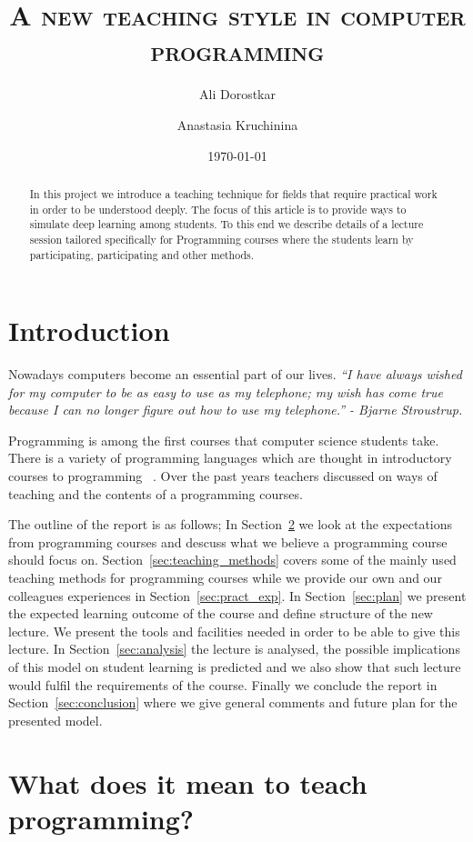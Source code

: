 \documentclass{article}
\author{Ali Dorostkar \and Anastasia Kruchinina}
\title{\textsc{A new teaching style in computer programming}}
\date{\today}
\begin{document}
\maketitle \begin{abstract}
In this project we introduce a teaching technique for fields that require
practical work in order to be understood deeply. The focus of this article is
to provide ways to simulate deep learning among students. To this end we describe
details of a lecture session tailored specifically for Programming courses
where the students learn by participating, participating and other methods.
\end{abstract}

\section{Introduction} %
\label{sec:introduction}

Nowadays computers become an essential part of our lives.  \emph{``I have always wished
for my computer to be as easy to use as my telephone; my wish has come true
because I can no longer figure out how to use my telephone.'' - Bjarne
Stroustrup.}

Programming is among the first courses that computer science students take.
There is a variety of programming languages which are thought in introductory
courses to programming ~\cite{de2002language}. Over the past years teachers
discussed on ways of teaching and the contents of a programming courses.

The outline of the report is as follows; In 
Section~\ref{sec:meaning_of_programming} we look at the expectations 
from programming courses and descuss what we believe a programming 
course should focus on. Section~\ref{sec:teaching_methods} covers 
some of the mainly used teaching methods for programming courses while we provide 
our own and our colleagues experiences in Section~\ref{sec:pract_exp}. 
In Section~\ref{sec:plan} we present the expected learning outcome of 
the course and define structure of the new lecture. We present the tools and facilities needed in order to be able to give this lecture. In
Section~\ref{sec:analysis} the lecture is analysed, the possible
implications of this model on student learning is predicted and we
also show that such lecture would fulfil the requirements of the
course. Finally we conclude the report in Section~\ref{sec:conclusion}
where we give general comments and future plan for the presented
model.

\section{What does it mean to teach programming?}
\label{sec:meaning_of_programming}
\end{document}
